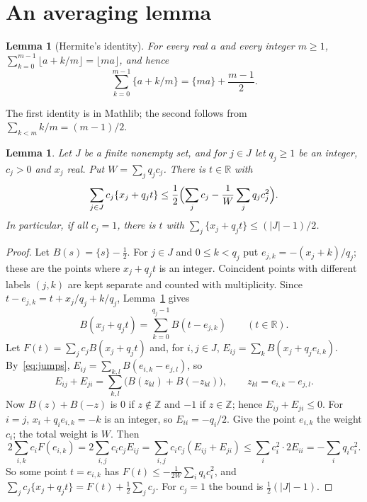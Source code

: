 \documentclass[11pt]{article}
\newtheorem{lemma}[theorem]{Lemma}
\theoremstyle{definition}
\theoremstyle{remark}
\newcommand{\R}{\mathbb R}
\newcommand{\Z}{\mathbb Z}
\newcommand{\fr}[1]{\{#1\}}
\begin{document}
\section{An averaging lemma}\label{sec:saw}

\begin{lemma}[Hermite's identity]\label{lem:hermite}
For every real $a$ and every integer $m\ge1$,
$\sum_{k=0}^{m-1}\lfloor a+k/m\rfloor=\lfloor ma\rfloor$, and hence
\[
\sum_{k=0}^{m-1}\fr{a+k/m}=\fr{ma}+\frac{m-1}2 .
\]
\end{lemma}

\noindent The first identity is in Mathlib; the second follows from
$\sum_{k<m}k/m=(m-1)/2$.

\begin{lemma}\label{lem:saw}
Let $J$ be a finite nonempty set, and for $j\in J$ let $q_j\ge1$ be an
integer, $c_j>0$ and $x_j$ real. Put $W=\sum_jq_jc_j$. There is $t\in\R$ with
\[
\sum_{j\in J}c_j\fr{x_j+q_jt}\le\frac12\Bigl(\sum_{j}c_j-\frac1W\sum_{j}q_jc_j^2\Bigr).
\]
In particular, if all $c_j=1$, there is $t$ with
$\sum_j\fr{x_j+q_jt}\le(|J|-1)/2$.
\end{lemma}

\begin{proof}
Let $B(s)=\fr s-\frac12$. For $j\in J$ and $0\le k<q_j$ put
$e_{j,k}=-(x_j+k)/q_j$; these are the points where $x_j+q_jt$ is an integer.
Coincident points with different labels $(j,k)$ are kept separate and counted
with multiplicity. Since $t-e_{j,k}=t+x_j/q_j+k/q_j$, Lemma~\ref{lem:hermite}
gives
\begin{equation}\label{eq:jumps}
B(x_j+q_jt)=\sum_{k=0}^{q_j-1}B(t-e_{j,k})\qquad(t\in\R).
\end{equation}
Let $F(t)=\sum_jc_jB(x_j+q_jt)$ and, for $i,j\in J$,
$E_{ij}=\sum_kB(x_j+q_je_{i,k})$. By~\eqref{eq:jumps},
$E_{ij}=\sum_{k,l}B(e_{i,k}-e_{j,l})$, so
\[
E_{ij}+E_{ji}=\sum_{k,l}\bigl(B(z_{kl})+B(-z_{kl})\bigr),\qquad z_{kl}=e_{i,k}-e_{j,l}.
\]
Now $B(z)+B(-z)$ is $0$ if $z\notin\Z$ and $-1$ if $z\in\Z$; hence
$E_{ij}+E_{ji}\le0$. For $i=j$, $x_i+q_ie_{i,k}=-k$ is an integer, so
$E_{ii}=-q_i/2$. Give the point $e_{i,k}$ the weight $c_i$; the total weight is
$W$. Then
\[
2\sum_{i,k}c_iF(e_{i,k})=2\sum_{i,j}c_ic_jE_{ij}
=\sum_{i,j}c_ic_j(E_{ij}+E_{ji})\le\sum_ic_i^2\cdot2E_{ii}=-\sum_iq_ic_i^2 .
\]
So some point $t=e_{i,k}$ has $F(t)\le-\frac1{2W}\sum_iq_ic_i^2$, and
$\sum_jc_j\fr{x_j+q_jt}=F(t)+\frac12\sum_jc_j$. For $c_j=1$ the bound is
$\frac12(|J|-1)$.
\end{proof}
\end{document}
